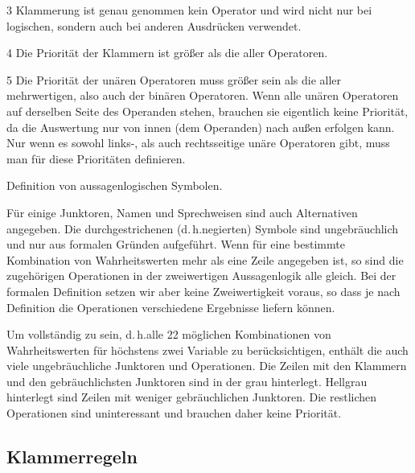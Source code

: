 \documentclass[english,ngerman,parskip=half,headsepline,footsepline,
	fleqn,notitlepage]{scrreprt}
\makeatletter
\newcommand*{\textdh}{d.\@\,h.\@ }
\makeatother
\begin{document}
\begin{table}
\begin{threeparttable}
\begin{tablenotes}
				\item[3] Klammerung ist genau genommen kein Operator
				und wird nicht nur bei logischen,
				sondern auch bei anderen Ausdrücken verwendet.

				\item[4] Die Priorität der Klammern
				ist größer als die aller Operatoren.

				\item[5] Die Priorität der unären Operatoren
				muss größer sein als die aller mehrwertigen,
				also auch der binären Operatoren.
				Wenn alle unären Operatoren
				auf derselben Seite des Operanden stehen,
				brauchen sie eigentlich keine Priorität,
				da die Auswertung nur von innen (dem Operanden)
				nach außen erfolgen kann.
				Nur wenn es sowohl links-, als auch rechtsseitige
				unäre Operatoren gibt,
				muss man für diese Prioritäten definieren.

			\end{tablenotes}
			\caption{Definition von aussagenlogischen Symbolen.}
			\label{tab:Symbole}%
		\end{threeparttable}
	\end{table}

	Für einige Junktoren, Namen und Sprechweisen
	sind auch Alternativen angegeben.
	Die durchgestrichenen (\textdh negierten) Symbole sind ungebräuchlich
	und nur aus formalen Gründen aufgeführt.
	Wenn für eine bestimmte Kombination von Wahrheitswerten
	mehr als eine Zeile angegeben ist,
	so sind die zugehörigen Operationen
	in der zweiwertigen Aussagenlogik alle gleich.
	Bei der formalen Definition setzen wir aber keine Zweiwertigkeit voraus,
	so dass je nach Definition
	die Operationen verschiedene Ergebnisse liefern können.

	Um vollständig zu sein,
	\textdh alle 22 möglichen Kombinationen von Wahrheitswerten
	für höchstens zwei Variable zu berücksichtigen,
	enthält die \tablename{}
	auch viele ungebräuchliche Junktoren und Operationen.
	Die Zeilen mit den Klammern und den gebräuchlichsten Junktoren
	sind in der \tablename{} grau hinterlegt.
	Hellgrau hinterlegt sind Zeilen mit weniger gebräuchlichen Junktoren.
	Die restlichen Operationen sind uninteressant
	und brauchen daher keine Priorität.

	\subsection{Klammerregeln}%
	\label{sub:Klammerregeln}
\end{document}

